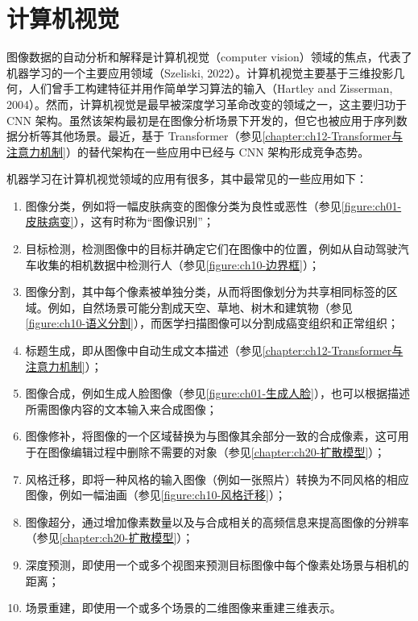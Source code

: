 \documentclass[../../main.tex]{subfiles}
\begin{document}
\section{计算机视觉}\label{section:ch10-计算机视觉}

图像数据的自动分析和解释是计算机视觉（computer vision）领域的焦点，代表了机器学习的一个主要应用领域（Szeliski, 2022）。计算机视觉主要基于三维投影几何，人们曾手工构建特征并用作简单学习算法的输入（Hartley and Zisserman, 2004）。然而，计算机视觉是最早被深度学习革命改变的领域之一，这主要归功于 CNN 架构。虽然该架构最初是在图像分析场景下开发的，但它也被应用于序列数据分析等其他场景。最近，基于 Transformer（参见\cref{chapter:ch12-Transformer与注意力机制}）的替代架构在一些应用中已经与 CNN 架构形成竞争态势。

机器学习在计算机视觉领域的应用有很多，其中最常见的一些应用如下：
\begin{enumerate}
  \item 图像分类，例如将一幅皮肤病变的图像分类为良性或恶性（参见\cref{figure:ch01-皮肤病变}），这有时称为“图像识别”；
  \item 目标检测，检测图像中的目标并确定它们在图像中的位置，例如从自动驾驶汽车收集的相机数据中检测行人（参见\cref{figure:ch10-边界框}）；
  \item 图像分割，其中每个像素被单独分类，从而将图像划分为共享相同标签的区域。例如，自然场景可能分割成天空、草地、树木和建筑物（参见\cref{figure:ch10-语义分割}），而医学扫描图像可以分割成癌变组织和正常组织；
  \item 标题生成，即从图像中自动生成文本描述（参见\cref{chapter:ch12-Transformer与注意力机制}）；
  \item 图像合成，例如生成人脸图像（参见\cref{figure:ch01-生成人脸}），也可以根据描述所需图像内容的文本输入来合成图像；
  \item 图像修补，将图像的一个区域替换为与图像其余部分一致的合成像素，这可用于在图像编辑过程中删除不需要的对象（参见\cref{chapter:ch20-扩散模型}）；
  \item 风格迁移，即将一种风格的输入图像（例如一张照片）转换为不同风格的相应图像，例如一幅油画（参见\cref{figure:ch10-风格迁移}）；
  \item 图像超分，通过增加像素数量以及与合成相关的高频信息来提高图像的分辨率（参见\cref{chapter:ch20-扩散模型}）；
  \item 深度预测，即使用一个或多个视图来预测目标图像中每个像素处场景与相机的距离；
  \item 场景重建，即使用一个或多个场景的二维图像来重建三维表示。
\end{enumerate}
\end{document}

